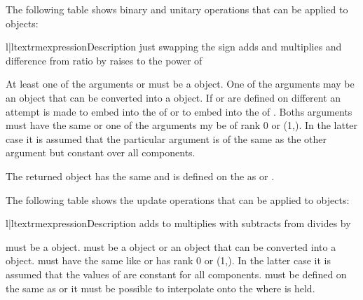The following table shows binary and unitary operations that can be applied to
\Data objects:
\begin{tableii}{l|l}{textrm}{expression}{Description}
 {just  \index{+}}
 {swapping the sign\index{-}}
 {adds  and  \index{+}}
 {multiplies  and  \index{*}}
 {difference  from \index{-}}
 {ratio  by  \index{/}}
 {raises  to the power of  \index{**}}
\end{tableii}
At least one of the arguments  or  must be a
\Data object. One of the arguments may be an object that can be
converted into a \Data object. If  or  are
defined on different \FunctionSpace an attempt is made to embed 
into the \FunctionSpace of  or to embed  into
the \FunctionSpace of . Boths arguments must have the same
\Shape or one of the arguments my be of rank 0 or \Shape (1,). In the
latter case it is assumed that the particular argument is of the same
\Shape as the other argument but constant over all components.

The returned \Data object has the same \Shape and is defined on
the \DataSamplePoints as  or .

The following table shows the update operations that can be applied to
\Data objects:
\begin{tableii}{l|l}{textrm}{expression}{Description}
 {adds  to  \index{+}}
 {multiplies  with  \index{*}}
 {subtracts  from \index{-}}
 {divides  by  \index{/}}
\end{tableii}
 must be a \Data object.  must be a
\Data object or an object that can be converted into a
\Data object.  must have the same \Shape like
 or has rank 0 or \Shape (1,).  In the latter case it is
assumed that the values of  are constant for all
components.  must be defined on the same \DataSamplePoints as
 or it must be possible to interpolate  onto the
\DataSamplePoints where  is held.

